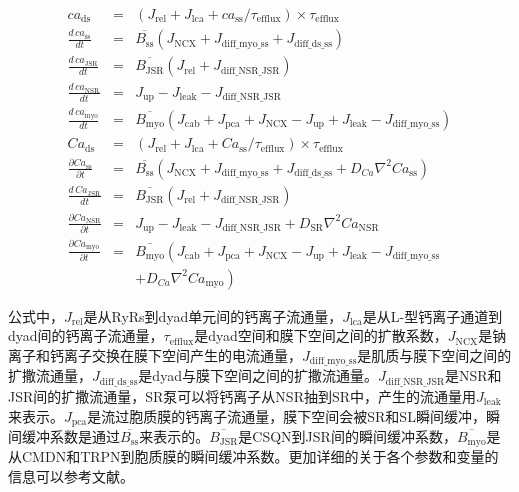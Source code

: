 {
\allowdisplaybreaks
 \begin{eqnarray}
  ca_{\mathrm{ds}}& = & (J_{\mathrm{rel}} + J_{\mathrm{lca}} + ca_{\mathrm{ss}} / \tau_{\mathrm{efflux}})\times \tau_{\mathrm{efflux}}\label{eq:1}\\
  \frac{d\, ca_{\mathrm{ss}}}{dt}& = & \overline{B_{\mathrm{ss}}}\left(  J_{\mathrm{NCX}} + J_{\mathrm{diff\_myo\_ss}} + J_{\mathrm{diff\_ds\_ss}}\right) \label{eq:2}\\
  \frac{d\,ca_{\mathrm{JSR}}}{dt}& = & \overline{B_{\mathrm{JSR}}}\left(J_{\mathrm{rel}} + J_{\mathrm{diff\_NSR\_JSR}}\right) \label{eq:3}\\
  \frac{d\,ca_{\mathrm{NSR}}}{dt}& = & J_{\mathrm{up}} - J_{\mathrm{leak}} - J_{\mathrm{diff\_NSR\_JSR}}  \label{eq:4}\\ 
  \frac{d\,ca_{\mathrm{myo}}}{dt}& = & \overline{B_{\mathrm{myo}}}\left(J_{\mathrm{cab}} + J_{\mathrm{pca}} + J_{\mathrm{NCX}} - J_{\mathrm{up}} + J_{\mathrm{leak}} - J_{\mathrm{diff\_myo\_ss}}\right) \label{eq:5}\\
  Ca_{\mathrm{ds}}& = & (J_{\mathrm{rel}} + J_{\mathrm{lca}} + Ca_{\mathrm{ss}} / \tau_{\mathrm{efflux}})\times \tau_{\mathrm{efflux}}\label{eq:6}\\  
  \frac{\partial Ca_{\mathrm{ss}}}{\partial t}& = & \overline{B_{\mathrm{ss}}} \left(J_{\mathrm{NCX}} + J_{\mathrm{diff\_myo\_ss}} + J_{\mathrm{diff\_ds\_ss}}
+ D_{Ca}\nabla^2Ca_{\mathrm{ss}}\right) \label{eq:7}\\
  \frac{d\,Ca_{\mathrm{JSR}}}{dt}& = & \overline{B_{\mathrm{JSR}}}\left(J_{\mathrm{rel}} + J_{\mathrm{diff\_NSR\_JSR}}\right) \label{eq:8}\\
  \frac{\partial Ca_{\mathrm{NSR}}}{\partial t}& = & J_{\mathrm{up}} - J_{\mathrm{leak}} - J_{\mathrm{diff\_NSR\_JSR}}  +  D_{\mathrm{SR}}\nabla^2 Ca_{\mathrm{NSR}}\label{eq:9}\\					
  \frac{\partial Ca_{\mathrm{myo}}}{\partial t}& = &
                                                     \overline{B_\mathrm{myo}}\left(J_\mathrm{cab} + J_\mathrm{pca} + J_\mathrm{NCX} - J_\mathrm{up} + J_\mathrm{leak} - J_\mathrm{diff\_myo\_ss}\right.\nonumber\\
&&+ \left. D_{Ca}\nabla^2Ca_{\mathrm{myo}}\right)
\label{eq:10}
  \end{eqnarray}
}
%

公式中，$J_{\mathrm{rel}}$是从RyRs到dyad单元间的钙离子流通量，$J_{\mathrm{lca}}$是从L-型钙离子通道到dyad间的钙离子流通量，$\tau_{\mathrm{efflux}}$是dyad空间和膜下空间之间的扩散系数，$J_{\mathrm{NCX}}$是钠离子和钙离子交换在膜下空间产生的电流通量，$J_{\mathrm{diff\_myo\_ss}}$是肌质与膜下空间之间的扩撒流通量，$J_{\mathrm{diff\_ds\_ss}}$是dyad与膜下空间之间的扩撒流通量。$J_{\mathrm{diff\_NSR\_JSR}}$是NSR和JSR间的扩撒流通量，SR泵可以将钙离子从NSR抽到SR中，产生的流通量用$J_{\mathrm{leak}}$来表示。$J_{\mathrm{pca}}$是流过胞质膜的钙离子流通量，膜下空间会被SR和SL瞬间缓冲，瞬间缓冲系数是通过$\overline{B_{\mathrm{ss}}}$来表示的。$\overline{B_{\mathrm{JSR}}}$是CSQN到JSR间的瞬间缓冲系数，$\overline{B_{\mathrm{myo}}}$是从CMDN和TRPN到胞质膜的瞬间缓冲系数。更加详细的关于各个参数和变量的信息可以参考文献。

